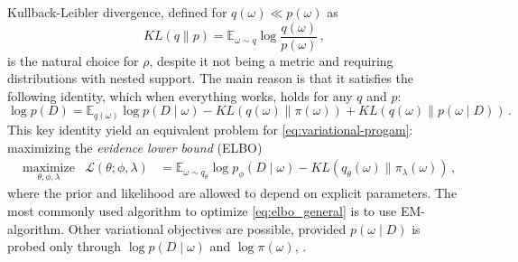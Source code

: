 \documentclass[a4paper,10pt]{article}
\begin{document}
Kullback-Leibler divergence, defined for $q(\omega) \ll p(\omega)$ as
$$
KL(q\| p)
  = \mathbb{E}_{\omega \sim q}
    \log\frac{q(\omega)}{p(\omega)}
  \,, $$
is the natural choice for $\rho$, despite it not being a metric and requiring distributions
with nested support. The main reason is that it satisfies the following identity, which when
everything works, holds for any $q$ and $p$:
\begin{equation} \label{eq:kl-div-master}
  \log p(D)
    = \mathbb{E}_{q(\omega)} \log{p(D \mid \omega)}
    - KL(q(\omega) \| \pi(\omega))
    + KL(q(\omega) \| p(\omega \mid D))
    \,.
\end{equation}
This key identity yield an equivalent problem for \eqref{eq:variational-progam}:
maximizing the \textit{evidence lower bound} (ELBO)
\begin{equation} \label{eq:elbo_general}
\begin{aligned}
  & \underset{\theta, \phi, \lambda}{\text{maximize}}
    & \mathcal{L}(\theta; \phi, \lambda)
      & = \mathbb{E}_{\omega \sim q_{\theta}}
          \log p_{\phi}(D \mid \omega)
        - KL(q_{\theta}(\omega) \| \pi_{\lambda}(\omega))
  \,,
\end{aligned}
\end{equation}
where the prior and likelihood are allowed to depend on explicit parameters. The most
commonly used algorithm to optimize \eqref{eq:elbo_general} is to use EM-algorithm.
Other variational objectives are possible, provided $p(\omega \mid D)$ is probed only
through $\log p(D \mid \omega)$ and $\log \pi(\omega)$, \cite{ranganath_operator_2018}.
\end{document}
